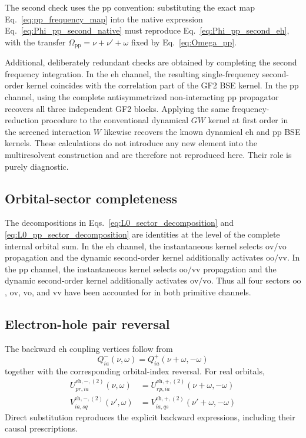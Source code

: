 \documentclass[aip,jcp,reprint,noshowkeys,superscriptaddress]{revtex4-1}
\newcommand{\eh}{\text{eh}}
\newcommand{\pp}{\text{pp}}
\begin{document}
The second check uses the $\pp$ convention: substituting the exact map
Eq.~\eqref{eq:pp_frequency_map} into the native expression
Eq.~\eqref{eq:Phi_pp_second_native} must reproduce
Eq.~\eqref{eq:Phi_pp_second_eh}, with the transfer
$\Omega_\pp=\nu+\nu'+\omega$ fixed by Eq.~\eqref{eq:Omega_pp}.

Additional, deliberately redundant checks are obtained by completing the
second frequency integration.
In the $\eh$ channel, the resulting single-frequency second-order kernel
coincides with the correlation part of the GF2 BSE kernel.
In the $\pp$ channel, using the complete antisymmetrized non-interacting
$\pp$ propagator recovers all three independent GF2 blocks.\cite{MarieRomanielloBlaseLoos2025}
Applying the same frequency-reduction procedure to the conventional dynamical
$GW$ kernel at first order in the screened interaction $W$ likewise recovers
the known dynamical $\eh$ and $\pp$ BSE kernels.\cite{MarieAmmarLoos2024,MarieRomanielloLoos2024,MarieRomanielloBlaseLoos2025}
These calculations do not introduce any new element into the multiresolvent
construction and are therefore not reproduced here.
Their role is purely diagnostic.


\subsection{Orbital-sector completeness}

The decompositions in Eqs.~\eqref{eq:L0_sector_decomposition} and
\eqref{eq:L0_pp_sector_decomposition} are identities at the level of the
complete internal orbital sum.
In the $\eh$ channel, the instantaneous kernel selects $\text{ov}/\text{vo}$ propagation
and the dynamic second-order kernel additionally activates $\text{oo}/\text{vv}$.
In the $\pp$ channel, the instantaneous kernel selects $\text{oo}/\text{vv}$ propagation
and the dynamic second-order kernel additionally activates $\text{ov}/\text{vo}$.
Thus all four sectors $\text{oo}$, $\text{ov}$, $\text{vo}$, and $\text{vv}$ have been accounted for in
both primitive channels.

\subsection{Electron-hole pair reversal}

The backward $\eh$ coupling vertices follow from
\begin{equation}
    Q^-_{ia}(\nu,\omega)
    =
    Q^+_{ia}(\nu+\omega,-\omega)
    \label{eq:Q_reversal_third}
\end{equation}
together with the corresponding orbital-index reversal.
For real orbitals,
\begin{align}
    U^{\eh,-,(2)}_{pr,ia}(\nu,\omega)
    &=
    U^{\eh,+,(2)}_{rp,ia}(\nu+\omega,-\omega)
    \label{eq:U_eh_pair_reversal}
    \\
    V^{\eh,-,(2)}_{ia,sq}(\nu',\omega)
    &=
    V^{\eh,+,(2)}_{ia,qs}(\nu'+\omega,-\omega)
    \label{eq:V_eh_pair_reversal}
\end{align}
Direct substitution reproduces the explicit backward expressions, including
their causal prescriptions.
\end{document}
